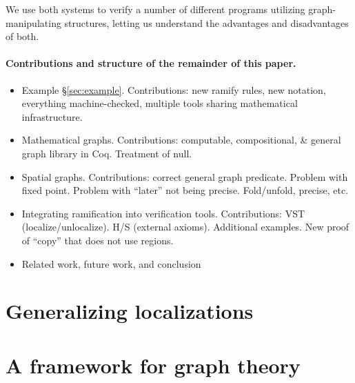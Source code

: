\documentclass[pldi]{sigplanconf-pldi15}
\begin{document}
We use both systems to verify a number of different programs utilizing graph-manipulating structures,
letting us understand the advantages and disadvantages of both.

\paragraph{Contributions and structure of the remainder of this paper.}
\begin{itemize}
\item Example \S\ref{sec:example}.  Contributions: new ramify rules, new notation, everything machine-checked, multiple tools sharing mathematical infrastructure.
\item Mathematical graphs.  Contributions: computable, compositional, \& general graph library in Coq.  Treatment of null.
\item Spatial graphs.  Contributions: correct general graph predicate.  Problem with fixed point.  Problem with ``later'' not being precise.  Fold/unfold, precise, etc.
\item Integrating ramification into verification tools.  Contributions: VST (localize/unlocalize). H/S (external axioms).  Additional examples.  New proof of ``copy'' that does not use regions.
\item Related work, future work, and conclusion
\end{itemize}

\section{Generalizing localizations}
\label{sec:orientation}



\section{A framework for graph theory}
\label{sec:mathgraph}






\end{document}
